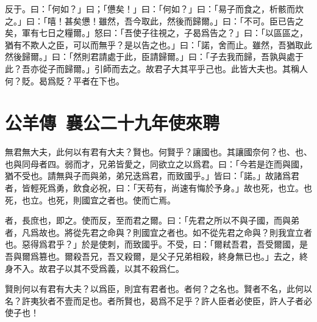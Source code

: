 反于。曰：「何如？」曰；「憊矣！」曰：「何如？」曰：「易子而食之，析骸而炊之。」曰：「嘻！甚矣憊！雖然，吾今取此，然後而歸爾。」曰：「不可。臣已告之矣，軍有七日之糧爾。」怒曰：「吾使子往視之，子曷爲告之？」曰：「以區區之，猶有不欺人之臣，可以而無乎？是以告之也。」曰：「諾，舍而止。雖然，吾猶取此然後歸爾。」曰：「然則君請處于此，臣請歸爾。」曰：「子去我而歸，吾孰與處于此？吾亦從子而歸爾。」引師而去之。故君子大其平乎己也。此皆大夫也。其稱人何？貶。曷爲貶？平者在下也。

\theendnotes

\section[吳子使季札來聘\quad{\small 公羊傳 襄公二十九年}]{{\normalsize 公羊傳\ 襄公二十九年}\quad {}使來聘}
無君無大夫，此何以有君有大夫？賢也。何賢乎？讓國也。其讓國奈何？也、也、也與同母者四。弱而才，兄弟皆愛之，同欲立之以爲君。曰：「今若是迮而與國，猶不受也。請無與子而與弟，弟兄迭爲君，而致國乎。」皆曰：「諾。」故諸爲君者，皆輕死爲勇，飲食必祝，曰：「天苟有，尚速有悔於予身。」故也死，也立。也死，也立。也死，則國宜之者也。使而亡焉。

者，長庶也，即之。使而反，至而君之爾。曰：「先君之所以不與子國，而與弟者，凡爲故也。將從先君之命與？則國宜之者也。如不從先君之命與？則我宜立者也。惡得爲君乎？」於是使刺，而致國乎。不受，曰：「爾弒吾君，吾受爾國，是吾與爾爲篡也。爾殺吾兄，吾又殺爾，是父子兄弟相殺，終身無已也。」去之，終身不入。故君子以其不受爲義，以其不殺爲仁。

賢則何以有君有大夫？以爲臣，則宜有君者也。者何？之名也。賢者不名，此何以名？許夷狄者不壹而足也。者所賢也，曷爲不足乎？許人臣者必使臣，許人子者必使子也！

